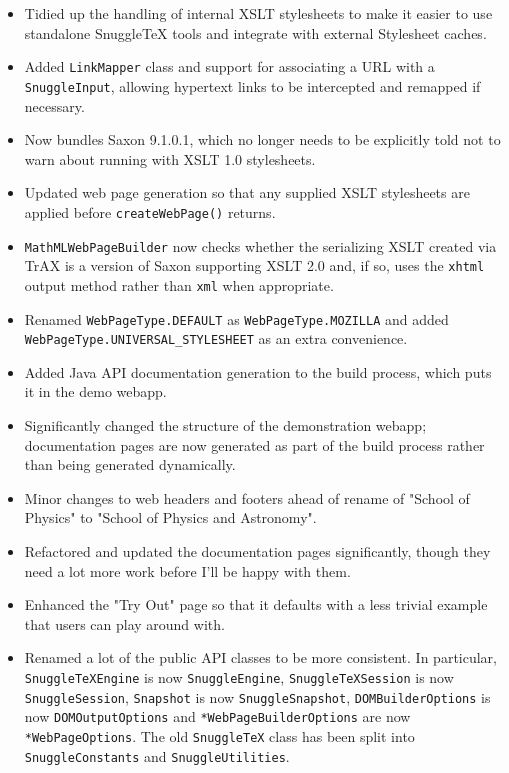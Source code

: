 \begin{itemize}
  \item Tidied up the handling of internal XSLT stylesheets to make it easier
  to use standalone SnuggleTeX tools and integrate with external Stylesheet
  caches.

  \item Added \verb|LinkMapper| class and support for associating a URL with a
  \verb|SnuggleInput|, allowing hypertext links to be intercepted and remapped
  if necessary.

  \item Now bundles Saxon 9.1.0.1, which no longer needs to be explicitly told
  not to warn about running with XSLT 1.0 stylesheets.

  \item Updated web page generation so that any supplied XSLT stylesheets are
  applied before \verb|createWebPage()| returns.

  \item \verb|MathMLWebPageBuilder| now checks whether the serializing XSLT
  created via TrAX is a version of Saxon supporting XSLT 2.0 and, if so,
  uses the \verb|xhtml| output method rather than \verb|xml| when appropriate.

  \item Renamed \verb|WebPageType.DEFAULT| as \verb|WebPageType.MOZILLA| and
  added \verb|WebPageType.UNIVERSAL_STYLESHEET| as an extra convenience.

  \item Added Java API documentation generation to the build process, which
  puts it in the demo webapp.

  \item Significantly changed the structure of the demonstration webapp;
  documentation pages are now generated as part of the build process rather
  than being generated dynamically.

  \item Minor changes to web headers and footers ahead of rename of "School of
  Physics" to "School of Physics and Astronomy".

  \item Refactored and updated the documentation pages significantly, though
  they need a lot more work before I'll be happy with them.

  \item Enhanced the "Try Out" page so that it defaults with a less trivial
  example that users can play around with.

  \item Renamed a lot of the public API classes to be more consistent. In
  particular, \verb|SnuggleTeXEngine| is now \verb|SnuggleEngine|,
  \verb|SnuggleTeXSession| is now \verb|SnuggleSession|,
  \verb|Snapshot| is now \verb|SnuggleSnapshot|,
  \verb|DOMBuilderOptions| is now \verb|DOMOutputOptions| and
  \verb|*WebPageBuilderOptions| are now \verb|*WebPageOptions|.
  The old \verb|SnuggleTeX| class has been split into \verb|SnuggleConstants|
  and \verb|SnuggleUtilities|.

\end{itemize}

